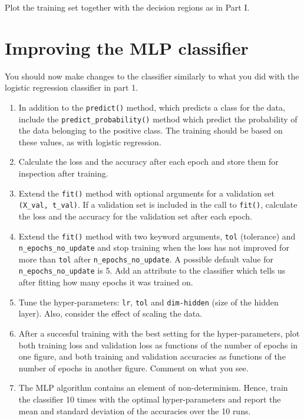 \documentclass[11pt]{article}
\begin{document}
Plot the training set together with the decision regions as in Part I.

    \hypertarget{improving-the-mlp-classifier}{%
\section{Improving the MLP
classifier}\label{improving-the-mlp-classifier}}

You should now make changes to the classifier similarly to what you did
with the logistic regression classifier in part 1.

\begin{enumerate}
\def\labelenumi{\alph{enumi})}
\item
  In addition to the \texttt{predict()} method, which predicts a class
  for the data, include the \texttt{predict\_probability()} method which
  predict the probability of the data belonging to the positive class.
  The training should be based on these values, as with logistic
  regression.
\item
  Calculate the loss and the accuracy after each epoch and store them
  for inspection after training.
\item
  Extend the \texttt{fit()} method with optional arguments for a
  validation set \texttt{(X\_val,\ t\_val)}. If a validation set is
  included in the call to \texttt{fit()}, calculate the loss and the
  accuracy for the validation set after each epoch.
\item
  Extend the \texttt{fit()} method with two keyword arguments,
  \texttt{tol} (tolerance) and \texttt{n\_epochs\_no\_update} and stop
  training when the loss has not improved for more than \texttt{tol}
  after \texttt{n\_epochs\_no\_update}. A possible default value for
  \texttt{n\_epochs\_no\_update} is 5. Add an attribute to the
  classifier which tells us after fitting how many epochs it was trained
  on.
\item
  Tune the hyper-parameters: \texttt{lr}, \texttt{tol} and
  \texttt{dim-hidden} (size of the hidden layer). Also, consider the
  effect of scaling the data.
\item
  After a succesful training with the best setting for the
  hyper-parameters, plot both training loss and validation loss as
  functions of the number of epochs in one figure, and both training and
  validation accuracies as functions of the number of epochs in another
  figure. Comment on what you see.
\item
  The MLP algorithm contains an element of non-determinism. Hence, train
  the classifier 10 times with the optimal hyper-parameters and report
  the mean and standard deviation of the accuracies over the 10 runs.
\end{enumerate}
\end{document}
